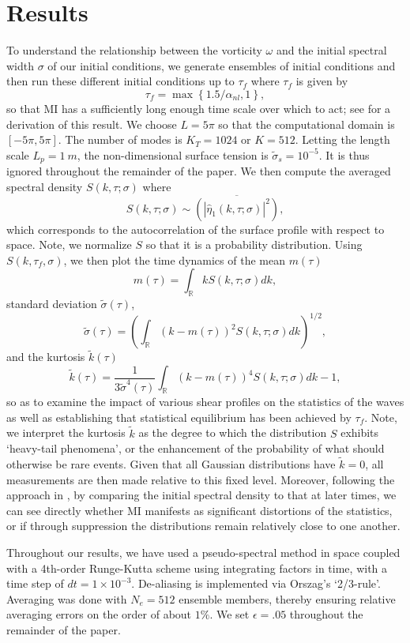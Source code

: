 \documentclass[a4paper,11pt]{article}
\begin{document}
\section{Results}
To understand the relationship between the vorticity $\omega$ and the initial spectral width $\sigma$ of our initial conditions, we generate ensembles of initial conditions and then run these different initial conditions up to $\tau_{f}$ where $\tau_{f}$ is given by
\[
\tau_{f}=\max\left\{1.5/\alpha_{nl},1\right\},
\]
so that MI has a sufficiently long enough time scale over which to act; see \cite{curtis8} for a derivation of this result.  We choose $L=5\pi$ so that the computational domain is $[-5\pi,5\pi]$.  The number of modes is $K_{T} = 1024$ or $K=512$.  Letting the length scale $L_{p}=1~m$, the non-dimensional surface tension is $\tilde{\sigma}_{s} = 10^{-5}$.  It is thus ignored throughout the remainder of the paper.  We then compute the averaged spectral density $S(k,\tau;\sigma)$ where 
\[
S\left(k,\tau;\sigma\right) \sim \overline{\left( \left|\hat{\eta}_{1}\left(k,\tau;\sigma \right)\right|^{2}\right)},
\]
which corresponds to the autocorrelation of the surface profile with respect to space.  Note, we normalize $S$ so that it is a probability distribution.  Using $S(k,\tau_{f},\sigma)$, we then plot the time dynamics of the mean $m(\tau)$
\[
m(\tau) = \int_{\mathbb{R}} k S\left(k,\tau;\sigma\right) dk,
\]
standard deviation $\tilde{\sigma}(\tau)$,
\[
\tilde{\sigma}(\tau) = \left(\int_{\mathbb{R}} (k-m(\tau))^{2} S\left(k,\tau;\sigma\right) dk\right)^{1/2},
\]
and the kurtosis $\tilde{k}(\tau)$
\[
\tilde{k}(\tau) = \frac{1}{3\tilde{\sigma}^{4}(\tau)}\int_{\mathbb{R}} (k-m(\tau))^{4} S\left(k,\tau;\sigma\right) dk - 1,
\]
so as to examine the impact of various shear profiles on the statistics of the waves as well as establishing that statistical equilibrium has been achieved by $\tau_{f}$.  Note, we interpret the kurtosis $\tilde{k}$ as the degree to which the distribution $S$ exhibits `heavy-tail phenomena', or the enhancement of the probability of what should otherwise be rare events.  Given that all Gaussian distributions have $\tilde{k}=0$, all measurements are then made relative to this fixed level.  Moreover, following the approach in \cite{dysthe2,dysthe3}, by comparing the initial spectral density to that at later times, we can see directly whether MI manifests as significant distortions of the statistics, or if through suppression the distributions remain relatively close to one another.  

Throughout our results, we have used a pseudo-spectral method in space coupled with a 4th-order Runge-Kutta scheme using integrating factors in time, with a time step of $dt = 1 \times 10^{-3}$.  De-aliasing is implemented via Orszag's `2/3-rule'.  Averaging was done with $N_{e}=512$ ensemble members, thereby ensuring relative averaging errors on the order of about $1\%$.  We set $\epsilon=.05$ throughout the remainder of the paper.  
\end{document}
